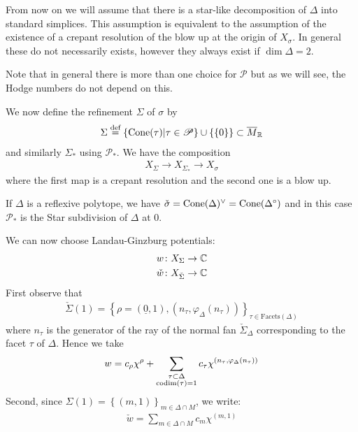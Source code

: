 \documentclass[../main.tex]{subfiles}
\begin{document}
From now on we will assume that there is a star-like decomposition of $\Delta$ into standard simplices.
This assumption is equivalent to the assumption of the existence of a crepant resolution of the blow up at the origin of $X_\sigma$.
In general these do not necessarily exists, however they always exist if $\dim \Delta = 2$.

Note that in general there is more than one choice for $\mathscr{P}$ but as we will see, the Hodge numbers do not depend on this.

We now define the refinement $\Sigma$ of $\sigma$ by
\begin{align*}
    \Sigma \stackrel{\text{def}}{=} \left\{ \operatorname{Cone}(\tau) | \tau \in \mathscr{P} \right\} \cup \{ \{0 \} \} \subset \overline{M}_{\mathbb{R}}
\end{align*}
and similarly $\Sigma_*$ using $\mathscr{P}_*$.
We have the composition 
\begin{align*}
    X_\Sigma \to X_{\Sigma_*} \to X_\sigma
\end{align*}
where the first map is a crepant resolution and the second one is a blow up.

\begin{es}
    If $\Delta$ is a reflexive polytope, we have $\check{\sigma} = \operatorname{Cone}(\Delta)^\vee = \operatorname{Cone}(\Delta^\circ)$ and in this case $\mathscr{P}_*$ is the Star subdivision of $\Delta$ at $0$.
\end{es}

We can now choose Landau-Ginzburg potentials:
\begin{align*}
    w \colon X_{\Sigma} &\to \mathbb{C} \\
    \check{w} \colon X_{\check{\Sigma}} &\to \mathbb{C} 
\end{align*}
First observe that 
\begin{align*}
    \check{\Sigma}(1) = \left\{ \rho =(\underline{0},1), (n_\tau,\varphi_\Delta(n_\tau)) \right\}_{\tau \in \text{Facets}(\Delta)}
\end{align*}
where $n_\tau$ is the generator of the ray of the normal fan $\check{\Sigma}_\Delta$ corresponding to the facet $\tau $ of $\Delta$.
Hence we take
\begin{align*}
    w = c_\rho \chi^\rho + \sum_{\substack{\tau \subset \Delta \\ \operatorname{codim} (\tau)=1 } } c_\tau \chi^{\left( n_\tau,\varphi_\Delta(n_\tau) \right)}
\end{align*}
Second, since $\Sigma(1)= \left\{ (m,1) \right\}_{m \in \Delta \cap M}$, we write:
\begin{align*}
    \check{w} = \sum_{m \in \Delta \cap M} c_m \chi^{(m,1)}
\end{align*}
\end{document}
